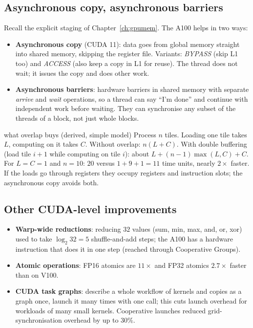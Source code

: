 \subsection{Asynchronous copy, asynchronous barriers}
Recall the explicit staging of Chapter~\ref{ch:gpumem}. The A100 helps in two ways:
\begin{itemize}
  \item \textbf{Asynchronous copy} (CUDA 11): data goes from global memory straight into shared memory, skipping the register file. Variants: \emph{BYPASS} (skip L1 too) and \emph{ACCESS} (also keep a copy in L1 for reuse). The thread does not wait; it issues the copy and does other work.
  \item \textbf{Asynchronous barriers}: hardware barriers in shared memory with separate \emph{arrive} and \emph{wait} operations, so a thread can say ``I'm done'' and continue with independent work before waiting. They can synchronise any subset of the threads of a block, not just whole blocks.
\end{itemize}
\begin{workedex}{what overlap buys (derived, simple model)}
Process $n$ tiles. Loading one tile takes $L$, computing on it takes $C$. Without overlap: $n(L+C)$. With double buffering (load tile $i+1$ while computing on tile $i$): about $L+(n-1)\max(L,C)+C$.
For $L=C=1$ and $n=10$: $20$ versus $1+9+1=11$ time units, nearly $2\times$ faster. If the loads go through registers they occupy registers and instruction slots; the asynchronous copy avoids both.
\end{workedex}

\subsection{Other CUDA-level improvements}
\begin{itemize}
  \item \textbf{Warp-wide reductions}: reducing $32$ values (sum, min, max, and, or, xor) used to take $\log_2 32=5$ shuffle-and-add steps; the A100 has a hardware instruction that does it in one step (reached through Cooperative Groups).
  \item \textbf{Atomic operations}: FP16 atomics are $11\times$ and FP32 atomics $2.7\times$ faster than on V100.
  \item \textbf{CUDA task graphs}: describe a whole workflow of kernels and copies as a graph once, launch it many times with one call; this cuts launch overhead for workloads of many small kernels. Cooperative launches reduced grid-synchronisation overhead by up to $30\%$.
\end{itemize}

